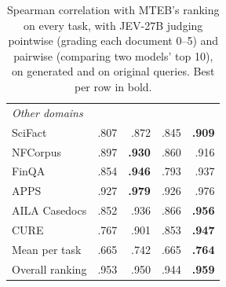 \begin{table}[t]
\begin{tabular}{lrrrr}
\midrule
\multicolumn{5}{l}{\textit{Other domains}} \\
SciFact & .807 & .872 & .845 & \textbf{.909} \\
NFCorpus & .897 & \textbf{.930} & .860 & .916 \\
FinQA & .854 & \textbf{.946} & .793 & .937 \\
APPS & .927 & \textbf{.979} & .926 & .976 \\
AILA Casedocs & .852 & .936 & .866 & \textbf{.956} \\
CURE & .767 & .901 & .853 & \textbf{.947} \\
\midrule
Mean per task & .665 & .742 & .665 & \textbf{.764} \\
Overall ranking & .953 & .950 & .944 & \textbf{.959} \\
\bottomrule
\end{tabular}
\caption{Spearman correlation with MTEB's ranking on every task, with JEV-27B judging pointwise (grading each document 0--5) and pairwise (comparing two models' top 10), on generated and on original queries. Best per row in bold.}
\label{tab:all_main}
\end{table}

